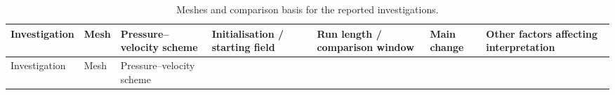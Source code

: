 \documentclass[12pt]{article}
\begin{document}
\begin{landscape}
\begingroup{}\fontsize{9}{10.5}\selectfont\setlength{\tabcolsep}{3pt}\setlength{\LTpre}{3pt}
{
\renewcommand{\thetable}{A1a}
\begin{longtable}[]{@{}
  >{\raggedright\arraybackslash}p{}
  >{\raggedright\arraybackslash}p{}
  >{\raggedright\arraybackslash}p{}
  >{\raggedright\arraybackslash}p{}
  >{\raggedright\arraybackslash}p{}
  >{\raggedright\arraybackslash}p{}
  >{\raggedright\arraybackslash}p{}@{}}
\caption{Meshes and comparison basis for the reported investigations.}\label{tab:A1a}\tabularnewline
\toprule\noalign{}
\begin{minipage}[b]{\linewidth}\raggedright
Investigation
\end{minipage} & \begin{minipage}[b]{\linewidth}\raggedright
Mesh
\end{minipage} & \begin{minipage}[b]{\linewidth}\raggedright
Pressure--velocity scheme
\end{minipage} & \begin{minipage}[b]{\linewidth}\raggedright
Initialisation / starting field
\end{minipage} & \begin{minipage}[b]{\linewidth}\raggedright
Run length / comparison window
\end{minipage} & \begin{minipage}[b]{\linewidth}\raggedright
Main change
\end{minipage} & \begin{minipage}[b]{\linewidth}\raggedright
Other factors affecting interpretation
\end{minipage} \\
\midrule\noalign{}
\endfirsthead
\toprule\noalign{}
\begin{minipage}[b]{\linewidth}\raggedright
Investigation
\end{minipage} & \begin{minipage}[b]{\linewidth}\raggedright
Mesh
\end{minipage} & \begin{minipage}[b]{\linewidth}\raggedright
Pressure--velocity scheme
\end{minipage} & \begin{minipage}[b]{\linewidth}\raggedright

\end{minipage}
\end{longtable}}
\end{landscape}
\end{document}
